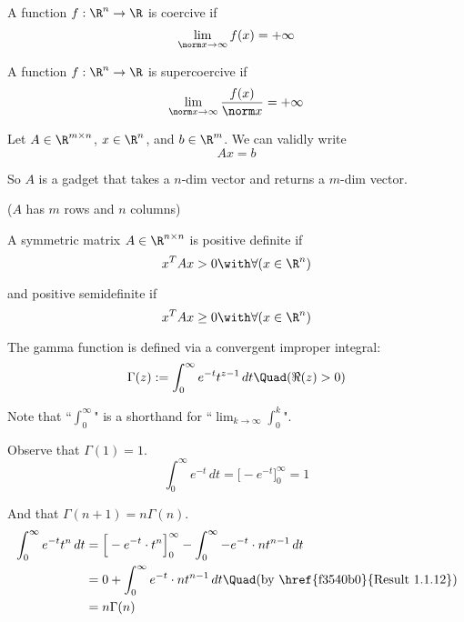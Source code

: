 A function $f:\R^n\to\R$ is coercive if
$$
	\lim_{\norm x\to\infty}f(x)=+\infty
$$

\label{a0444cc}

A function $f:\R^n\to\R$ is supercoercive if
$$
	\lim_{\norm x\to\infty}\frac{f(x)}{\norm x}=+\infty
$$

\label{d8bd136}

Let $A\in\R^{m\times n}$, $x\in\R^n$, and $b\in\R^m$. We can validly
write
$$
	Ax = b
$$

So $A$ is a gadget that takes a $n$-dim vector and returns a $m$-dim
vector.

($A$ has $m$ rows and $n$ columns)

\label{e25e722}

A symmetric matrix $A\in\R^{n\times n}$ is positive definite if
$$
	x^TAx>0\with\forall(x\in\R^n)
$$

and positive semidefinite if
$$
	x^TAx\geq0\with\forall(x\in\R^n)
$$

\label{ce1fa3f}

The gamma function is defined via a convergent improper integral:
$$
	\Gamma(z):=\int_0^\infty e^{-t}t^{z-1}\,dt\Quad(\Re(z)>0)
$$

Note that ``$\displaystyle\int_0^\infty$" is a shorthand for
``$\displaystyle\lim_{k\to\infty}\int_0^k$".

Observe that $\Gamma(1)=1$.
$$\int_0^\infty e^{-t}\,dt=\Big[-e^{-t}\Big]_0^\infty=1$$

And that $\Gamma(n+1)=n\Gamma(n)$.
\begin{align}
	\int_0^\infty e^{-t}t^n\,dt
	 & = \Big[-e^{-t}\cdot t^n\Big]_0^\infty-\int_0^\infty-e^{-t}\cdot nt^{n-1}\,dt              \\
	 & = 0+\int_0^\infty e^{-t}\cdot nt^{n-1}\,dt \Quad\text{(by \href{f3540b0}{Result 1.1.12})} \\
	 & = n\Gamma(n)
\end{align}